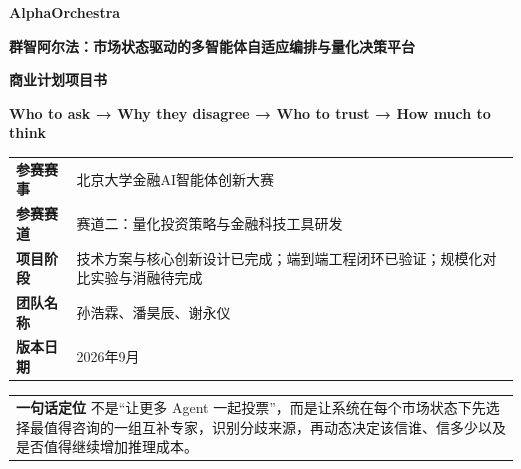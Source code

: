 \documentclass[12pt,a4paper]{ctexart}
\author{}
\date{}
\begin{document}
\begin{titlepage}
\thispagestyle{empty}
\centering
\vspace*{2.4cm}

{\bfseries{} AlphaOrchestra\par}

\vspace{0.9cm}

{\bfseries{} 群智阿尔法：市场状态驱动的多智能体自适应编排与量化决策平台\par}

\vspace{0.8cm}

{\bfseries{} 商业计划项目书\par}

\vspace{0.7cm}

{\bfseries\large Who to ask → Why they disagree → Who to trust → How much to
think\par}

\vspace{1.2cm}

\begin{longtable}[]{@{}
  >{\raggedright\arraybackslash}p{}
  >{\raggedright\arraybackslash}p{}@{}}
\toprule\noalign{}
\endhead
\bottomrule\noalign{}
\endlastfoot
\textbf{参赛赛事} & 北京大学金融AI智能体创新大赛 \\
\textbf{参赛赛道} & 赛道二：量化投资策略与金融科技工具研发 \\
\textbf{项目阶段} &
技术方案与核心创新设计已完成；端到端工程闭环已验证；规模化对比实验与消融待完成 \\
\textbf{团队名称} & 孙浩霖、潘昊辰、谢永仪 \\
\textbf{版本日期} & 2026年9月 \\
\end{longtable}

\begin{longtable}[]{@{}
  >{\raggedright\arraybackslash}p{}@{}}
\toprule\noalign{}
\endhead
\bottomrule\noalign{}
\endlastfoot
\textbf{一句话定位} 不是``让更多 Agent
一起投票''，而是让系统在每个市场状态下先选择最值得咨询的一组互补专家，识别分歧来源，再动态决定该信谁、信多少以及是否值得继续增加推理成本。 \\
\end{longtable}

\end{titlepage}
\end{document}
